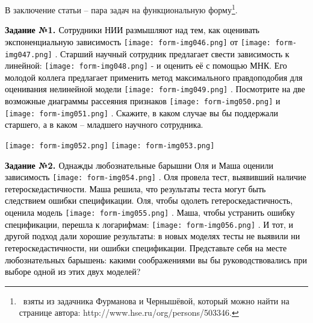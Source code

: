 \documentclass[a4paper]{article}
\begin{document}
В заключение статьи – пара задач на функциональную форму\footnote{\ взяты из задачника Фурманова и Чернышёвой, который можно найти на странице автора: http://www.hse.ru/org/persons/503346.}.


\bigskip

\textbf{\textcolor{black}{Задание №1. }}\textcolor{black}{Сотрудники НИИ размышляют над тем, как оценивать экспоненциальную зависимость } \texttt{[image: form-img046.png]} \textcolor{black}{ от } \texttt{[image: form-img047.png]} \textcolor{black}{. Старший научный сотрудник предлагает свести зависимость к линейной: } \texttt{[image: form-img048.png]} \textcolor{black}{ - и оценить её с помощью МНК. Его молодой коллега предлагает применить метод максимального правдоподобия для оценивания нелинейной модели } \texttt{[image: form-img049.png]} \textcolor{black}{. Посмотрите на две возможные диаграммы рассеяния признаков } \texttt{[image: form-img050.png]} \textcolor{black}{ и } \texttt{[image: form-img051.png]} \textcolor{black}{. Скажите, в каком случае вы бы поддержали старшего, а в каком – младшего научного сотрудника.}

{\centering  \texttt{[image: form-img052.png]}  \texttt{[image: form-img053.png]} \par}

\bigskip


\bigskip

\textbf{\textcolor{black}{Задание №2. }}\textcolor{black}{Однажды любознательные барышни Оля и Маша оценили зависимость } \texttt{[image: form-img054.png]} \textcolor{black}{. Оля провела тест, выявивший наличие гетероскедастичности. Маша решила, что результаты теста могут быть следствием ошибки спецификации. Оля, чтобы одолеть гетероскедастичность, оценила модель } \texttt{[image: form-img055.png]} \textcolor{black}{. Маша, чтобы устранить ошибку спецификации, перешла к логарифмам: } \texttt{[image: form-img056.png]} \textcolor{black}{. И тот, и другой подход дали хорошие результаты: в новых моделях тесты не выявили ни гетероскедастичности, ни ошибки спецификации. Представьте себя на месте любознательных барышень: какими соображениями вы бы руководствовались при выборе одной из этих двух моделей?}
\end{document}
